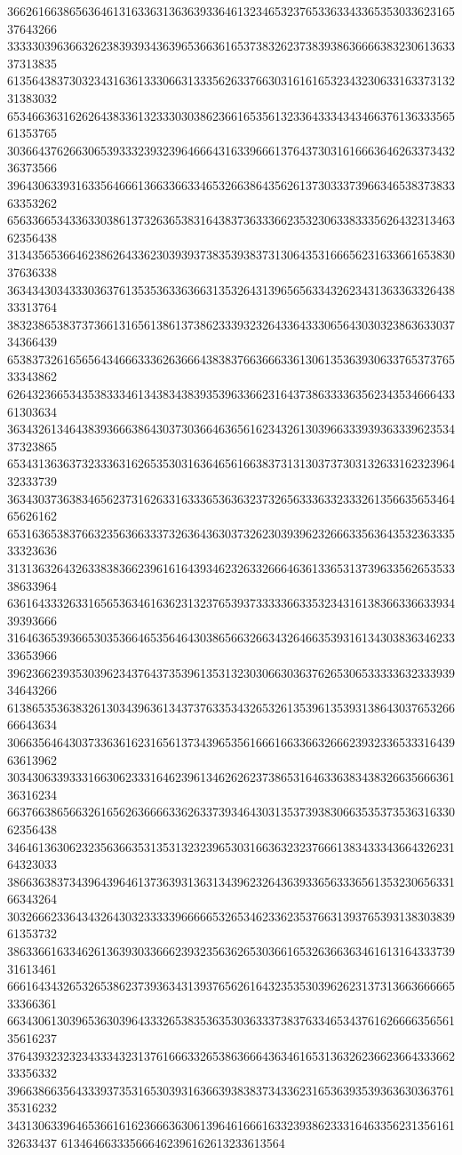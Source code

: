 36626166386563646131633631363639336461323465323765336334336535303362316537643266
33333039636632623839393436396536636165373832623738393863666638323061363337313835
61356438373032343163613330663133356263376630316161653234323063316337313231383032
65346636316262643833613233303038623661653561323364333434346637613633356561353765
30366437626630653933323932396466643163396661376437303161666364626337343236373566
39643063393163356466613663366334653266386435626137303337396634653837383363353262
65633665343363303861373263653831643837363336623532306338333562643231346362356438
31343565366462386264336230393937383539383731306435316665623163366165383037636338
36343430343330363761353536336366313532643139656563343262343136336332643833313764
38323865383737366131656138613738623339323264336433306564303032386363303734366439
65383732616565643466633362636664383837663666336130613536393063376537376533343862
62643236653435383334613438343839353963366231643738633336356234353466643361303634
36343261346438393666386430373036646365616234326130396633393936333962353437323865
65343136363732333631626535303163646561663837313130373730313263316232396432333739
36343037363834656237316263316333653636323732656333633233326135663565346465626162
65316365383766323563663337326364363037326230393962326663356364353236333533323636
31313632643263383836623961616439346232633266646361336531373963356265353338633964
63616433326331656536346163623132376539373333366335323431613836633663393439393666
31646365393665303536646535646430386566326634326466353931613430383634623333653966
39623662393530396234376437353961353132303066303637626530653333363233393934643266
61386535363832613034396361343737633534326532613539613539313864303765326666643634
30663564643037336361623165613734396535616661663366326662393233653331643963613962
30343063393331663062333164623961346262623738653164633638343832663566636136316234
66376638656632616562636666336263373934643031353739383066353537353631633062356438
34646136306232356366353135313232396530316636323237666138343334366432623164323033
38663638373439643964613736393136313439623264363933656333656135323065633166343264
30326662336434326430323333396666653265346233623537663139376539313830383961353732
38633661633462613639303366623932356362653036616532636636346161316433373931613461
66616434326532653862373936343139376562616432353530396262313731366366666533366361
66343061303965363039643332653835363530363337383763346534376162666635656135616237
37643932323234333432313761666332653863666436346165313632623662366433366233356332
39663866356433393735316530393163663938383734336231653639353936363036376135316232
34313063396465366161623666363061396461666163323938623331646335623135616132633437
613464663335666462396162613233613564
